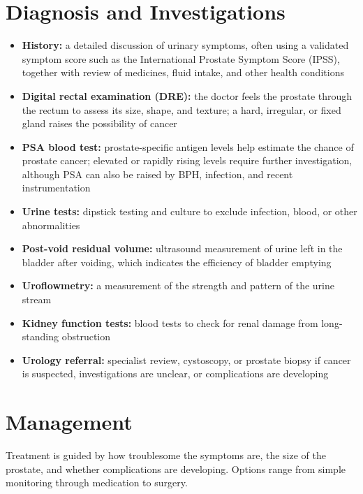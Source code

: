 \section*{Diagnosis and Investigations}
\begin{itemize}
    \item \textbf{History:} a detailed discussion of urinary symptoms, often using a validated symptom score such as the International Prostate Symptom Score (IPSS), together with review of medicines, fluid intake, and other health conditions
    \item \textbf{Digital rectal examination (DRE):} the doctor feels the prostate through the rectum to assess its size, shape, and texture; a hard, irregular, or fixed gland raises the possibility of cancer
    \item \textbf{PSA blood test:} prostate-specific antigen levels help estimate the chance of prostate cancer; elevated or rapidly rising levels require further investigation, although PSA can also be raised by BPH, infection, and recent instrumentation
    \item \textbf{Urine tests:} dipstick testing and culture to exclude infection, blood, or other abnormalities
    \item \textbf{Post-void residual volume:} ultrasound measurement of urine left in the bladder after voiding, which indicates the efficiency of bladder emptying
    \item \textbf{Uroflowmetry:} a measurement of the strength and pattern of the urine stream
    \item \textbf{Kidney function tests:} blood tests to check for renal damage from long-standing obstruction
    \item \textbf{Urology referral:} specialist review, cystoscopy, or prostate biopsy if cancer is suspected, investigations are unclear, or complications are developing
\end{itemize}

\section*{Management}
Treatment is guided by how troublesome the symptoms are, the size of the prostate, and whether complications are developing. Options range from simple monitoring through medication to surgery.

